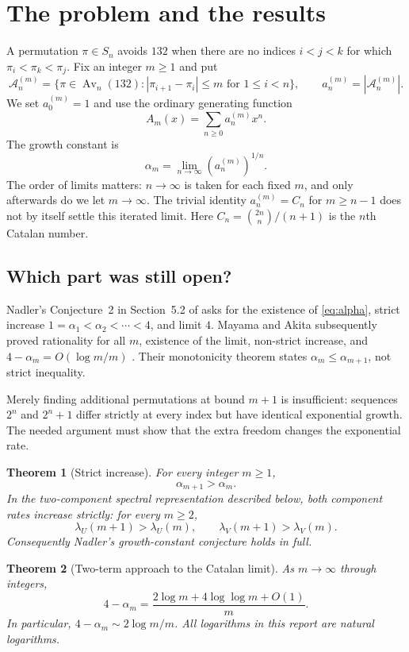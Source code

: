 \documentclass[11pt,a4paper]{article}
\newtheorem{theorem}{Theorem}[section]
\theoremstyle{definition}\newaliascnt{definition}{theorem}
\theoremstyle{remark}\newaliascnt{remark}{theorem}
\newcommand{\Av}{\operatorname{Av}}
\newcommand{\Aclass}{\mathcal A}
\begin{document}
\section{The problem and the results}
\label{sec:results}
A permutation $\pi\in S_n$ avoids $132$ when there are no indices $i<j<k$ for
which $\pi_i<\pi_k<\pi_j$. Fix an integer $m\ge1$ and put
\[
\Aclass_n^{(m)}=\{\pi\in\Av_n(132):|\pi_{i+1}-\pi_i|\le m
                  \text{ for }1\le i<n\},\qquad
 a_n^{(m)}=|\Aclass_n^{(m)}|.
\]
We set $a_0^{(m)}=1$ and use the ordinary generating function
\[
 A_m(x)=\sum_{n\ge0}a_n^{(m)}x^n.
\]
The growth constant is
\begin{equation}
 \alpha_m=\lim_{n\to\infty}(a_n^{(m)})^{1/n}.
 \label{eq:alpha}
\end{equation}
The order of limits matters: $n\to\infty$ is taken for each fixed $m$, and
only afterwards do we let $m\to\infty$. The trivial identity
$a_n^{(m)}=C_n$ for $m\ge n-1$ does not by itself settle this iterated limit.
Here $C_n=\binom{2n}{n}/(n+1)$ is the $n$th Catalan number.

\subsection{Which part was still open?}
Nadler's Conjecture~2 in Section~5.2 of \cite{Nadler} asks for the existence of
\eqref{eq:alpha}, strict increase $1=\alpha_1<\alpha_2<\cdots<4$, and limit $4$.
Mayama and Akita subsequently proved rationality for all $m$, existence of the
limit, non-strict increase, and $4-\alpha_m=O(\log m/m)$
\cite[Theorems~2.4, 4.12, and 4.14]{MayamaAkita}. Their monotonicity theorem
states $\alpha_m\le\alpha_{m+1}$, not strict inequality.

Merely finding additional permutations at bound $m+1$ is insufficient:
sequences $2^n$ and $2^n+1$ differ strictly at every index but have identical
exponential growth. The needed argument must show that the extra freedom
changes the exponential rate.

\begin{theorem}[Strict increase]\label{thm:strict-main}
For every integer $m\ge1$,
\[
 \alpha_{m+1}>\alpha_m.
\]
In the two-component spectral representation described below, both component
rates increase strictly: for every $m\ge2$,
\[
 \lambda_U(m+1)>\lambda_U(m),\qquad
 \lambda_V(m+1)>\lambda_V(m).
\]
Consequently Nadler's growth-constant conjecture holds in full.
\end{theorem}

\begin{theorem}[Two-term approach to the Catalan limit]\label{thm:asympt-main}
As $m\to\infty$ through integers,
\begin{equation}
 4-\alpha_m=\frac{2\log m+4\log\log m+O(1)}{m}.
 \label{eq:main-asympt}
\end{equation}
In particular, $4-\alpha_m\sim2\log m/m$. All logarithms in this report are
natural logarithms.
\end{theorem}
\end{document}
